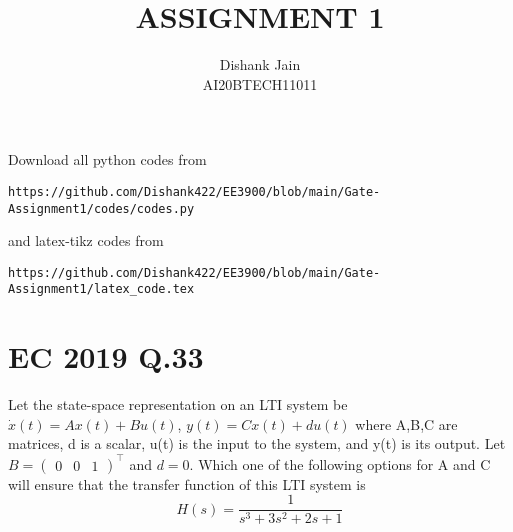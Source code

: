 \documentclass[journal,12pt,twocolumn]{IEEEtran}
\begin{document}
     \def\centbox#1{\makebox[0in]{#1}}
     \def\topbox#1{\raisebox{-\baselineskip}[0in][0in]{#1}}
     \def\midbox#1{\raisebox{-0.5\baselineskip}[0in][0in]{#1}}
\vspace{3cm}
\title{ASSIGNMENT 1}
\author{Dishank Jain \\ AI20BTECH11011}
\maketitle
\newpage
\bigskip
\renewcommand{\thefigure}{\theenumi}
\renewcommand{\thetable}{\theenumi}
Download all python codes from 
\begin{lstlisting}
https://github.com/Dishank422/EE3900/blob/main/Gate-Assignment1/codes/codes.py
\end{lstlisting}
%
and latex-tikz codes from 
%
\begin{lstlisting}
https://github.com/Dishank422/EE3900/blob/main/Gate-Assignment1/latex_code.tex
\end{lstlisting}
%
\section{EC 2019 Q.33}
Let the state-space representation on an LTI system be $\dot{x}(t) = Ax(t)+Bu(t)$, $y(t)=Cx(t)+du(t)$ where A,B,C are matrices,  d is a scalar, u(t) is the input to the system, and y(t) is its output. Let $B = \begin{pmatrix} 0 & 0 &  1\end{pmatrix}^\top$ and $d = 0$. Which one of the following options for A and C will ensure that the transfer function of this LTI system is 
\begin{equation}
    H(s) = \dfrac{1}{s^3+3s^2+2s+1}
\end{equation}
\end{document}
